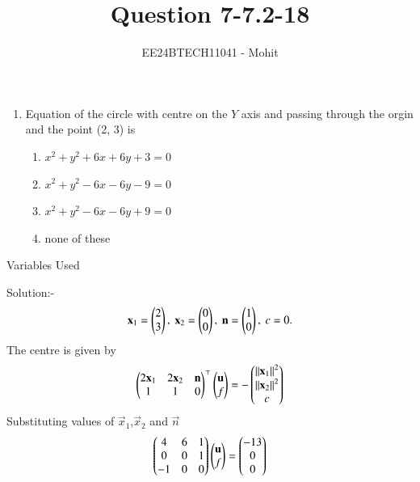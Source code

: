 \documentclass[journal]{IEEEtran}
\numberwithin{equation}{enumi}
\numberwithin{figure}{enumi}
\begin{document}

\title{Question 7-7.2-18}
\author{EE24BTECH11041 - Mohit}
{\let\newpage\relax\maketitle}
\begin{enumerate}
	\item Equation of the circle with centre on the $Y$ axis and passing through the orgin and the point (2, 3) is
\begin{enumerate}
\item $x^2+y^2+6x+6y+3=0$ 
\item $x^2+y^2-6x-6y-9=0$
\item $x^2+y^2-6x-6y+9=0$
\item none of these
\end{enumerate}
\end{enumerate}
\begin{table}[h!]    
  \centering
  
  \caption{Variables Used}
  \label{tab 1.4.9.2}
\end{table}
Solution:-\\
\begin{align}
	\mathbf{x}_{1} = \begin{pmatrix}2\\3\end{pmatrix},\ \mathbf{x}_{2} = \begin{pmatrix}0\\0\end{pmatrix},\
	\mathbf{n} = \begin{pmatrix}1 \\ 0\end{pmatrix},\  c= 0.
\end{align}
The centre is given by
\begin{align}
\begin{pmatrix}
 2 \mathbf{x}_1 & 2 \mathbf{x}_2 & \mathbf{n}
 \\
 1 & 1 & 0
 \end{pmatrix}^\top 
	\begin{pmatrix}\mathbf{u} \\ f\end{pmatrix}
	=
-\begin{pmatrix} 	\left\lVert\mathbf{x}_1\right\rVert^2 
\\
 	\left\lVert\mathbf{x}_2\right\rVert^2 	
	\\
	c     
	\end{pmatrix}
\end{align}
Substituting values of $\vec{x}_1$,$\vec{x}_2$ and $\vec{n}$
\begin{align}
	\begin{pmatrix}
	        4 & 6 & 1\\
	        0 & 0 & 1\\
-1 & 0 & 0\end{pmatrix}
	\begin{pmatrix}\mathbf{u}\\f\end{pmatrix} = 
	\begin{pmatrix}-13 \\ 0 \\ 0\end{pmatrix}
\end{align}
\end{document}
